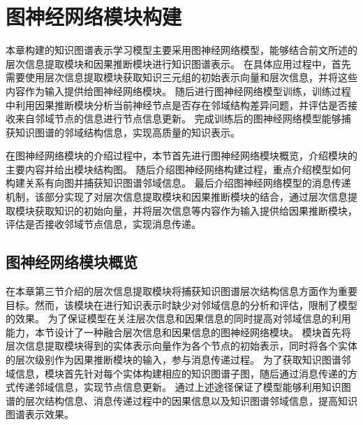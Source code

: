 \documentclass[algorithmlist, AutoFakeBold, AutoFakeSlant, figurelist, tablelist, nomlist, engineering]{seuthesix}
\begin{document}
\section{图神经网络模块构建}
本章构建的知识图谱表示学习模型主要采用图神经网络模型，能够结合前文所述的层次信息提取模块和因果推断模块进行知识图谱表示。
在具体应用过程中，首先需要使用层次信息提取模块获取知识三元组的初始表示向量和层次信息，并将这些内容作为输入提供给图神经网络模块。
随后进行图神经网络模型训练，训练过程中利用因果推断模块分析当前神经节点是否存在邻域结构差异问题，并评估是否接收来自邻域节点的信息进行节点信息更新。
完成训练后的图神经网络模型能够捕获知识图谱的邻域结构信息，实现高质量的知识表示。

在图神经网络模块的介绍过程中，本节首先进行图神经网络模块概览，介绍模块的主要内容并给出模块结构图。
随后介绍图神经网络构建过程，重点介绍模型如何构建关系有向图并捕获知识图谱邻域信息。
最后介绍图神经网络模型的消息传递机制，该部分实现了对层次信息提取模块和因果推断模块的结合，通过层次信息提取模块获取知识的初始向量，并将层次信息等内容作为输入提供给因果推断模块，评估是否接收邻域节点信息，实现消息传递。

\subsection{图神经网络模块概览}
在本章第三节介绍的层次信息提取模块将捕获知识图谱层次结构信息方面作为重要目标。然而，该模块在进行知识表示时缺少对邻域信息的分析和评估，限制了模型的效果。
为了保证模型在关注层次信息和因果信息的同时提高对邻域信息的利用能力，本节设计了一种融合层次信息和因果信息的图神经网络模块。
模块首先将层次信息提取模块得到的实体表示向量作为各个节点的初始表示，同时将各个实体的层次级别作为因果推断模块的输入，参与消息传递过程。
为了获取知识图谱邻域信息，模块首先针对每个实体构建相应的知识图谱子图，随后通过消息传递的方式传递邻域信息，实现节点信息更新。
通过上述途径保证了模型能够利用知识图谱的层次结构信息、消息传递过程中的因果信息以及知识图谱邻域信息，提高知识图谱表示效果。
\end{document}
